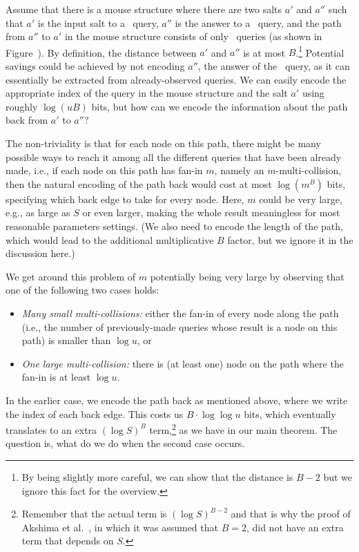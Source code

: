 Assume that there is a mouse structure where there are two salts $a'$ and $a''$ such that $a'$ is the input salt to a \frep\ query, $a''$ is the answer to a \new\ query, and the path from $a''$ to $a'$ in the mouse structure consists of only \urep\ queries (as shown in Figure~). By definition, the distance between $a'$ and $a''$ is at most $B$.\footnote{By being slightly more careful, we can show that the distance is $B-2$ but we ignore this fact for the overview.} Potential savings could be achieved by not encoding $a''$, the answer of the \new\ query, as it can essentially be extracted from already-observed queries. We can easily encode the appropriate index of the query in the mouse structure and the salt $a'$ using roughly $\log (uB)$ bits, but how can we encode the information about the path back from $a'$ to $a''$?

The non-triviality is that for each node on this path, there might be many possible ways to reach it among all the different queries that have been already made, i.e., if each node on this path has fan-in $m$, namely an $m$-multi-collision, then the natural encoding of the path back would cost at most $\log (m^B)$ bits, specifying which back edge to take for every node. 
Here, $m$ could be very large, e.g., as large as $S$ or even larger, making the whole result meaningless for most reasonable parameters settings. (We also need to encode the length of the path, which would lead to the additional multiplicative $B$ factor, but we ignore it in the discussion here.)
\ovhardcasefig

We get around this problem of $m$ potentially being very large by observing that one of the following two cases holds:
\begin{itemize}
\item \emph{Many small multi-collisions:} either the fan-in of every node along the path (i.e., the number of previously-made queries whose result is a node on this path) is smaller than $\log u$, or
\item \emph{One large multi-collision:} there is (at least one) node on the path where the fan-in is at least $\log u$.
\end{itemize}

In the earlier case, we encode the path back as mentioned above, where we write the index of each back edge. This costs us $B\cdot \log\log u$ bits, which eventually translates to an extra $(\log S)^B$ term,\footnote{Remember that the actual term is $(\log S)^{B-2}$ and that is why the proof of Akshima et al.~\cite{AkshimaCDW20}, in which it was assumed that $B=2$, did not have an extra term that depends on $S$.} as we have in our main theorem. The question is, what do we do when the second case occurs.

